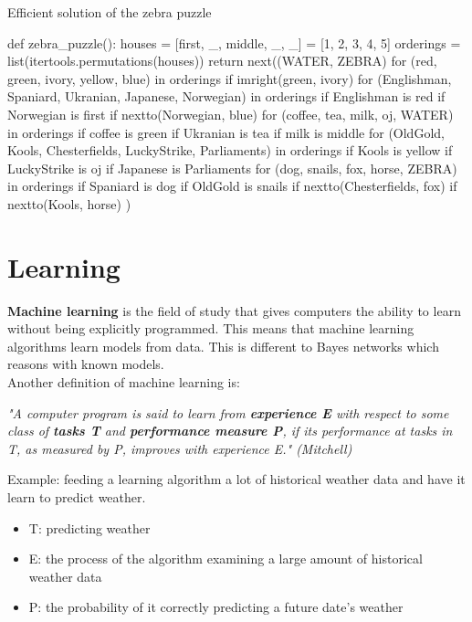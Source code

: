 \documentclass{report}
\begin{document}
\begin{algorithm}
\caption{Efficient solution of the zebra puzzle}
\label{python:zebrapuzzlefast}
\begin{python}
def zebra_puzzle():
    houses = [first, _, middle, _, _] = [1, 2, 3, 4, 5]
    orderings = list(itertools.permutations(houses))
    return next((WATER, ZEBRA)
                for (red, green, ivory, yellow, blue) in orderings
                if imright(green, ivory)
                for (Englishman, Spaniard, Ukranian,
                         Japanese, Norwegian) in orderings
                if Englishman is red
                if Norwegian is first
                if nextto(Norwegian, blue)
                for (coffee, tea, milk, oj, WATER) in orderings
                if coffee is green
                if Ukranian is tea
                if milk is middle
                for (OldGold, Kools, Chesterfields, LuckyStrike,
                        Parliaments) in orderings
                if Kools is yellow
                if LuckyStrike is oj
                if Japanese is Parliaments
                for (dog, snails, fox, horse, ZEBRA) in orderings
                if Spaniard is dog
                if OldGold is snails
                if nextto(Chesterfields, fox)
                if nextto(Kools, horse)
                )
\end{python}
\end{algorithm}



\chapter{Learning}

{\bf Machine learning} is the field of study that gives computers the ability to learn without being explicitly programmed.
This means that machine learning algorithms learn models from data.
This is different to Bayes networks which reasons with known models.
\\
Another definition of machine learning is:
\begin{flushright}
{\em "A computer program is said to learn from {\bf experience E} with respect to some class of {\bf tasks T} and {\bf performance measure P}, if its performance at tasks in T, as measured by P, improves with experience E." (Mitchell)}
\end{flushright}

Example: feeding a learning algorithm a lot of historical weather data and have it learn to predict weather.
\begin{itemize}
\item T: predicting weather
\item E: the process of the algorithm examining a large amount of historical weather data
\item P: the probability of it correctly predicting a future date's weather
\end{itemize}
\end{document}
